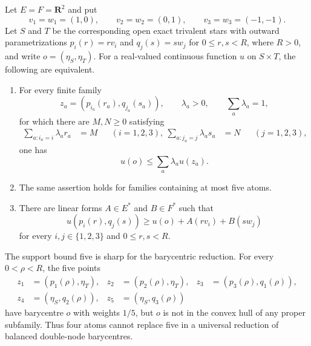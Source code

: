 
\begin{proposition}
\label{prop:p071-double-node-support-plane-reduction}
Let $E=F=\mathbf R^2$ and put
\[
 v_1=w_1=(1,0),\qquad
 v_2=w_2=(0,1),\qquad
 v_3=w_3=(-1,-1).
\]
Let $S$ and $T$ be the corresponding open exact trivalent stars with
outward parametrizations $p_i(r)=rv_i$ and $q_j(s)=sw_j$ for
$0\leq r,s<R$, where $R>0$, and write $o=(\eta_S,\eta_T)$.  For a real-valued
continuous function $u$ on $S\times T$, the following are equivalent.

\begin{enumerate}
\item For every finite family
\[
 z_a=(p_{i_a}(r_a),q_{j_a}(s_a)),\qquad
 \lambda_a>0,\qquad \sum_a\lambda_a=1,
\]
for which there are $M,N\geq0$ satisfying
\begin{align}
 \sum_{a:i_a=i}\lambda_ar_a&=M
       &&(i=1,2,3),\
 \sum_{a:j_a=j}\lambda_as_a&=N
       &&(j=1,2,3),
 \label{eq:p071-support-plane-balanced-data}
\end{align}
one has
\begin{equation}
                       u(o)\leq\sum_a\lambda_au(z_a).
 \label{eq:p071-support-plane-jensen}
\end{equation}

\item The same assertion holds for families containing at most five
atoms.

\item There are linear forms $A\in E^*$ and $B\in F^*$ such that
\begin{equation}
 u(p_i(r),q_j(s))
 \geq u(o)+A(rv_i)+B(sw_j)
 \label{eq:p071-support-plane-minorant}
\end{equation}
for every $i,j\in\{1,2,3\}$ and $0\leq r,s<R$.
\end{enumerate}

The support bound five is sharp for the barycentric reduction.  For every
$0<\rho<R$, the five points
\begin{equation}
 \begin{aligned}
 z_1&=(p_1(\rho),\eta_T),&
 z_2&=(p_2(\rho),\eta_T),&
 z_3&=(p_3(\rho),q_1(\rho)),\\
 z_4&=(\eta_S,q_2(\rho)),&
 z_5&=(\eta_S,q_3(\rho))
 \end{aligned}
 \label{eq:p071-support-plane-sharp-atoms}
\end{equation}
have barycentre $o$ with weights $1/5$, but $o$ is not in the convex hull
of any proper subfamily.  Thus four atoms cannot replace five in a
universal reduction of balanced double-node barycentres.
\end{proposition}
